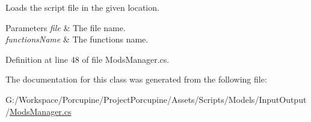 Loads the script file in the given location. 


\begin{DoxyParams}{Parameters}
{\em file} & The file name.\\
\hline
{\em functions\+Name} & The functions name.\\
\hline
\end{DoxyParams}


Definition at line 48 of file Mods\+Manager.\+cs.



The documentation for this class was generated from the following file\+:\begin{DoxyCompactItemize}
\item 
G\+:/\+Workspace/\+Porcupine/\+Project\+Porcupine/\+Assets/\+Scripts/\+Models/\+Input\+Output/\hyperlink{_mods_manager_8cs}{Mods\+Manager.\+cs}\end{DoxyCompactItemize}
